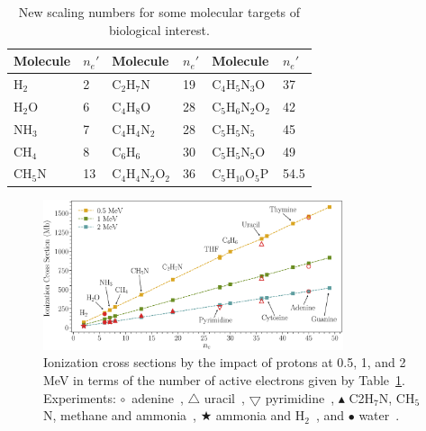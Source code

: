 \documentclass[10pt,showpacs,twocolumn]{revtex4}
\begin{document}
\begin{table}[t]
\begin{center}
\begin{tabular}{|p{}p{}|
p{}p{}|p{}p{}|}
\hline
 Molecule & $n_e'$ &Molecule          & $n_e'$ & Molecule             & $n_e'$\\
\hline
 H$_2$    & 2  & C$_2$H$_7$N         & 19    & C$_4$H$_5$N$_3$O     & 37   \\
 H$_2$O   & 6  & C$_4$H$_8$O         & 28    & C$_5$H$_6$N$_2$O$_2$ & 42   \\
 NH$_3$   & 7  & C$_4$H$_4$N$_2$     & 28    & C$_5$H$_5$N$_5$      & 45   \\
 CH$_4$   & 8  & C$_6$H$_6$          & 30    & C$_5$H$_5$N$_5$O     & 49   \\
 CH$_5$N  & 13 & C$_4$H$_4$N$_2$O$_2$& 36    & C$_5$H$_{10}$O$_5$P  & 54.5 \\
 \hline
\end{tabular}
\caption{New scaling numbers for some molecular targets of biological 
interest.}
\label{nn}
\end{center}
\end{table}

\begin{figure}[t!]
\centering
\includegraphics[width=0.785\textwidth]{figuras/scale_ne.eps}
\caption{Ionization cross sections by the impact of protons at 0.5, 1,
and 2 MeV in terms of the number of active electrons given by Table~\ref{nn}.
Experiments: 
\mbox{\Large$\circ$}~adenine~\cite{iriki2011}, 
$\triangle$ uracil~\cite{itoh2013}, 
$\bigtriangledown$ pyrimidine~\cite{wolff2014}, 
$\blacktriangle$ C2H$_7$N, CH$_5$N, methane and ammonia~\cite{lynch1976},
\mbox{\scriptsize$\bigstar$} ammonia and H$_2$~\cite{rudd1985}, and 
\mbox{\Large$\bullet$} water~\cite{luna2007}.}
\label{fig:recta}
\end{figure}
\end{document}
